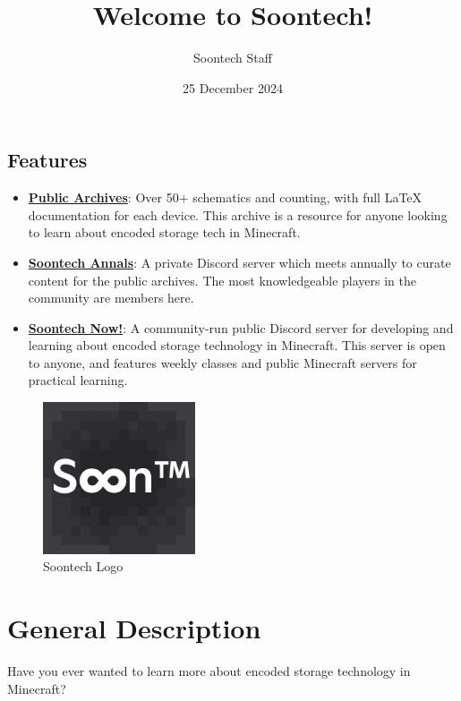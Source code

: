 \documentclass[10pt]{datasheet2}
\title{Welcome to Soontech!}
\author{Soontech Staff}
\date{25 December 2024}
\begin{document}
\maketitle



\begin{multicols}{2}
\section{Features}
\begin{itemize}
\item{
   \href{https://github.com/Soontech-Annals/Archive}{\textbf{Public Archives}}: Over 50+ schematics and counting, with full LaTeX documentation for each device. This archive is a resource for anyone looking to learn about encoded storage tech in Minecraft.
}
\item{
   \href{https://discord.gg/rJ4W8RHrhe}{\textbf{Soontech Annals}}: A private Discord server which meets annually to curate content for the public archives. The most knowledgeable players in the community are members here.
}
\item{
   \href{https://discord.gg/dkSM2PyzJe}{\textbf{Soontech Now!}}: A community-run public Discord server for developing and learning about encoded storage technology in Minecraft. This server is open to anyone, and features weekly classes and public Minecraft servers for practical learning.
}
\end{itemize}

\columnbreak

\begin{figure}[H]
    \centering
    \includegraphics[width=0.4\textwidth]{soontm2.png}
    \caption{\centering Soontech Logo}
\end{figure}

\end{multicols}

\section{General Description}
Have you ever wanted to learn more about encoded storage technology in Minecraft?
\end{document}
